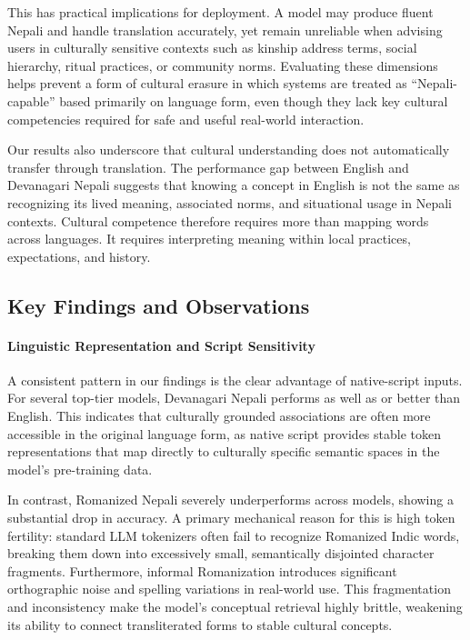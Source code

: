\documentclass[10pt, a4paper]{article}
\begin{document}
This has practical implications for deployment. A model may produce fluent Nepali and handle translation accurately, yet remain unreliable when advising users in culturally sensitive contexts such as kinship address terms, social hierarchy, ritual practices, or community norms. Evaluating these dimensions helps prevent a form of cultural erasure in which systems are treated as ``Nepali-capable'' based primarily on language form, even though they lack key cultural competencies required for safe and useful real-world interaction.

Our results also underscore that cultural understanding does not automatically transfer through translation. The performance gap between English and Devanagari Nepali suggests that knowing a concept in English is not the same as recognizing its lived meaning, associated norms, and situational usage in Nepali contexts. Cultural competence therefore requires more than mapping words across languages. It requires interpreting meaning within local practices, expectations, and history.

\subsection{Key Findings and Observations}

\paragraph{Linguistic Representation and Script Sensitivity}
A consistent pattern in our findings is the clear advantage of native-script inputs. For several top-tier models, Devanagari Nepali performs as well as or better than English. This indicates that culturally grounded associations are often more accessible in the original language form, as native script provides stable token representations that map directly to culturally specific semantic spaces in the model's pre-training data.

In contrast, Romanized Nepali severely underperforms across models, showing a substantial drop in accuracy. A primary mechanical reason for this is high token fertility: standard LLM tokenizers often fail to recognize Romanized Indic words, breaking them down into excessively small, semantically disjointed character fragments. Furthermore, informal Romanization introduces significant orthographic noise and spelling variations in real-world use. This fragmentation and inconsistency make the model's conceptual retrieval highly brittle, weakening its ability to connect transliterated forms to stable cultural concepts.
\end{document}
